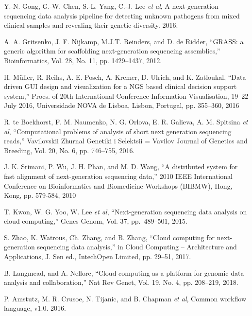 \documentclass[a4paper]{jpconf}
\begin{document}
\begin{thebibliography}{0}
 Y.-N. Gong, G.-W. Chen, S.-L. Yang, C.-J. Lee \emph{et al}, A next-generation sequencing data analysis pipeline for detecting unknown pathogens from mixed clinical samples and revealing their genetic diversity. 2016. 

 A. A. Gritsenko, J. F. Nijkamp, M.J.T. Reinders, and D. de Ridder, ``GRASS: a generic algorithm for scaffolding next-generation sequencing assemblies,'' Bioinformatics, Vol. 28, No. 11, pp. 1429–1437, 2012. 

 H. Müller, R. Reihs, A. E. Posch, A. Kremer, D. Ulrich, and K. Zatloukal, ``Data driven GUI design and visualization for a NGS based clinical decision support system,'' Procs. of 20th International Conference Information Visualisation, 19--22 July 2016, Universidade NOVA de Lisboa, Lisbon, Portugal, pp. 355--360, 2016 

 R. te Boekhorst, F. M. Naumenko, N. G. Orlova, E. R. Galieva, A. M. Spitsina \emph{et al}, ``Computational problems of analysis of short next generation sequencing reads,'' Vavilovskii Zhurnal Genetiki i Selektsii = Vavilov Journal of Genetics and Breeding, Vol. 20, No. 6, pp. 746--755, 2016. 

 J. K. Srimani, P. Wu, J. H. Phan, and M. D. Wang, ``A distributed system for fast alignment of next-generation sequencing data,'' 2010 IEEE International Conference on Bioinformatics and Biomedicine Workshops (BIBMW), Hong, Kong, pp. 579-584, 2010 

 T. Kwon, W. G. Yoo, W. Lee \emph{et al}, ``Next-generation sequencing data analysis on cloud computing,'' Genes Genom, Vol. 37, pp.~489--501, 2015. 

 S. Zhao, K. Watrous, Ch. Zhang, and B. Zhang, ``Cloud computing for next-generation sequencing data analysis,'' in Cloud Computing -- Architecture and Applications, J. Sen ed., IntechOpen Limited, pp. 29--51, 2017. 

 B. Langmead, and A. Nellore, ``Cloud computing as a platform for genomic data analysis and collaboration,'' Nat Rev Genet, Vol. 19, No. 4, pp. 208--219, 2018. 

 P. Amstutz, M. R. Crusoe, N. Tijanic, and B. Chapman \emph{et al}, Common workflow language, v1.0. 2016. 


\end{thebibliography}
\end{document}
